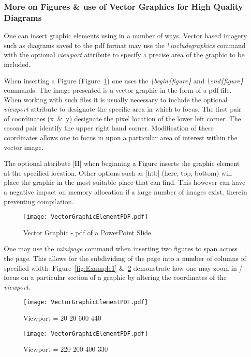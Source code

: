 \subsubsection{More on Figures \& use of Vector Graphics for High Quality Diagrams}
One can insert graphic elements using \latex in a number of ways. Vector based imagery such as diagrams saved to the pdf format may use the \emph{\textbackslash includegraphics} command with the optional \emph{viewport} attribute to specify a precise area of the graphic to be included. 

When inserting a Figure (Figure~\ref{fig:VectorGraphicElementPDF}) one uses the \emph{\textbackslash begin\{figure\}} and \emph{\textbackslash end\{figure\}} commands. The image presented is a vector graphic in the form of a pdf file. When working with such files it is usually necessary to include the optional \emph{viewport} attribute to designate the specific area in which to focus. The first pair of coordinates (x~\&~y) designate the pixel location of the lower left corner. The second pair identify the upper right hand corner. Modification of these coordinates allows one to focus in upon a particular area of interest within the vector image. 

The optional attribute [H] when beginning a Figure inserts the graphic element at the specified location. Other options such as [htb] (here, top, bottom) will place the graphic in the most suitable place that \latex can find. This however can have a negative impact on memory allocation if a large number of images exist, therein preventing compilation.


\begin{figure}[H]
\centering
\texttt{[image: VectorGraphicElementPDF.pdf]}
\caption{Vector Graphic - pdf of a PowerPoint Slide}
\label{fig:VectorGraphicElementPDF}
\end{figure}

One may use the \emph{minipage} command when inserting two figures to span across the page. This allows for the subdividing of the page into a number of columns of specified width. Figure~\ref{fig:Example1} \&~\ref{fig:Example2} demonstrate how one may zoom in / focus on a particular section of a graphic by altering the coordinates of the \emph{viewport}. 

\begin{figure}[H]
\begin{minipage}[t]{7.4cm}
\begin{center}
\texttt{[image: VectorGraphicElementPDF.pdf]}
\caption{Viewport = 20 20 600 440}
\label{fig:Example1}
\end{center}
\end{minipage}
\hfill
\begin{minipage}[t]{7.4cm}
\begin{center}
\texttt{[image: VectorGraphicElementPDF.pdf]}
\caption{Viewport = 220 200 400 330}
\label{fig:Example2}
\end{center}
\end{minipage}
\end{figure}


